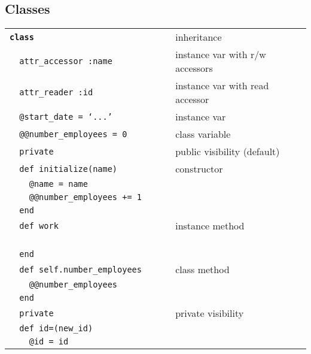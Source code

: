 \documentclass[6pt]{article}
\begin{document}
\begin{multicols}{3}
  \section{Classes}
  \begin{tabular}{L{0.55\linewidth} L{0.45\linewidth}}
    \tt \textbf{class}  & inheritance                     \\
    \tt ~~attr\_accessor :name                  & instance var with r/w accessors \\
    \tt ~~attr\_reader :id                      & instance var with read accessor \\
    \tt ~~@start\_date = `...'                  & instance var                    \\
    \tt ~~@@number\_employees = 0               & class variable                  \\
    \tt ~~private                               & public visibility (default)     \\
    \tt ~~def initialize(name)                  & constructor                     \\
    \tt ~~~~@name = name                                                          \\
    \tt ~~~~@@number\_employees += 1                                              \\
    \tt ~~end                                                                     \\
    \tt ~~def work                              & instance method                 \\
    \tt ~~~~                                                       \\
    \tt ~~end                                                                     \\
    \tt ~~def self.number\_employees            & class method                    \\
    \tt ~~~~@@number\_employees                                                   \\
    \tt ~~end                                                                     \\
    \tt ~~private                               & private visibility              \\
    \tt ~~def id=(new\_id)                                                        \\
    \tt ~~~~@id = id                                                              \\

\end{tabular}
\end{multicols}
\end{document}
